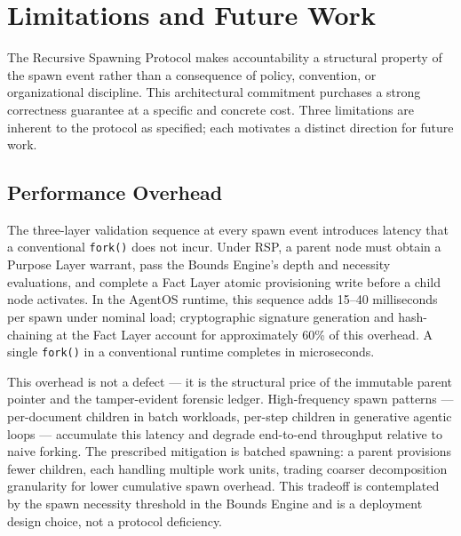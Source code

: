 \section{Limitations and Future Work}
\label{sec:rs-limitations}

The Recursive Spawning Protocol makes accountability a structural property of the spawn event rather than a consequence of policy, convention, or organizational discipline. This architectural commitment purchases a strong correctness guarantee at a specific and concrete cost. Three limitations are inherent to the protocol as specified; each motivates a distinct direction for future work.

\subsection{Performance Overhead}
\label{sec:rs-perf-overhead}

The three-layer validation sequence at every spawn event introduces latency that a conventional \texttt{fork()} does not incur. Under RSP, a parent node must obtain a Purpose Layer warrant, pass the Bounds Engine's depth and necessity evaluations, and complete a Fact Layer atomic provisioning write before a child node activates. In the AgentOS runtime, this sequence adds \numrange{15}{40} milliseconds per spawn under nominal load; cryptographic signature generation and hash-chaining at the Fact Layer account for approximately 60\% of this overhead. A single \texttt{fork()} in a conventional runtime completes in microseconds.

This overhead is not a defect — it is the structural price of the immutable parent pointer and the tamper-evident forensic ledger. High-frequency spawn patterns — per-document children in batch workloads, per-step children in generative agentic loops — accumulate this latency and degrade end-to-end throughput relative to naive forking. The prescribed mitigation is batched spawning: a parent provisions fewer children, each handling multiple work units, trading coarser decomposition granularity for lower cumulative spawn overhead. This tradeoff is contemplated by the spawn necessity threshold in the Bounds Engine and is a deployment design choice, not a protocol deficiency.

